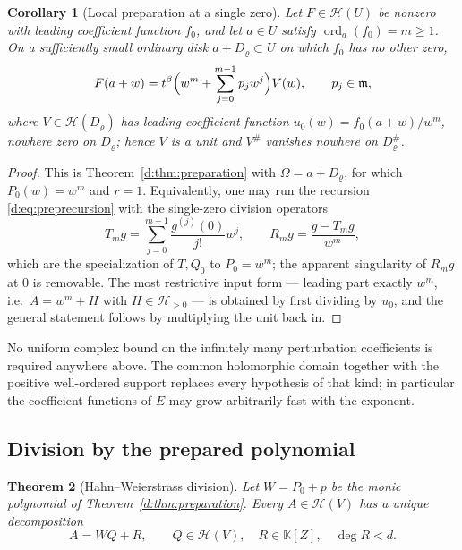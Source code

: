 \documentclass[11pt,a4paper]{article}
\numberwithin{equation}{section}
\newtheorem{theorem}{Theorem}[section]
\newtheorem{corollary}[theorem]{Corollary}
\theoremstyle{definition}
\theoremstyle{remark}
\theoremstyle{plain}
\newcommand{\K}{\mathbb K}
\newcommand{\mm}{\mathfrak m}
\DeclareMathOperator{\ord}{ord}
\newcommand{\tm}{t}
\newcommand{\halo}[1]{#1^{\#}}
\newcommand{\ev}[1]{#1^{\#}}
\newcommand{\Hc}{\mathcal H}
\begin{document}
\begin{corollary}[Local preparation at a single zero]
\label{d:cor:localprep}
Let $F\in\Hc(U)$ be nonzero with leading coefficient function $f_0$,
and let $a\in U$ satisfy $\ord_a(f_0)=m\ge1$.  On a sufficiently small
ordinary disk $a+D_\varrho\subset U$ on which $f_0$ has no other zero,
\begin{equation}\label{d:eq:localprep}
 F(a+w)=\tm^{\beta}\Bigl(w^{m}+\sum_{j=0}^{m-1}p_jw^{j}\Bigr)V(w),
 \qquad p_j\in\mm,
\end{equation}
where $V\in\Hc(D_\varrho)$ has leading coefficient function
$u_0(w)=f_0(a+w)/w^{m}$, nowhere zero on $D_\varrho$; hence $V$ is a
unit and $\ev V$ vanishes nowhere on $\halo{D_\varrho}$.
\end{corollary}

\begin{proof}
This is Theorem~\ref{d:thm:preparation} with $\Omega=a+D_\varrho$, for
which $P_0(w)=w^m$ and $r=1$.  Equivalently, one may run the recursion
\eqref{d:eq:preprecursion} with the single-zero division operators
\[
 T_mg=\sum_{j=0}^{m-1}\frac{g^{(j)}(0)}{j!}w^{j},
 \qquad R_mg=\frac{g-T_mg}{w^{m}},
\]
which are the specialization of $T,Q_0$ to $P_0=w^m$; the apparent
singularity of $R_mg$ at $0$ is removable.  The most restrictive input
form --- leading part exactly $w^m$, i.e.\ $A=w^m+H$ with
$H\in\Hc_{>0}$ --- is obtained by first dividing by $u_0$, and the
general statement follows by multiplying the unit back in.
\end{proof}

No uniform complex bound on the infinitely many perturbation
coefficients is required anywhere above.  The common holomorphic domain
together with the positive well-ordered support replaces every
hypothesis of that kind; in particular the coefficient functions of $E$
may grow arbitrarily fast with the exponent.

\subsection{Division by the prepared polynomial}
\label{d:sub:division}

\begin{theorem}[Hahn--Weierstrass division]
\label{d:thm:division}
Let $W=P_0+p$ be the monic polynomial of
Theorem~\ref{d:thm:preparation}.  Every $A\in\Hc(V)$ has a unique
decomposition
\begin{equation}\label{d:eq:division}
 A=WQ+R,\qquad Q\in\Hc(V),\quad R\in\K[Z],\quad \deg R<d .
\end{equation}
\end{theorem}
\end{document}
